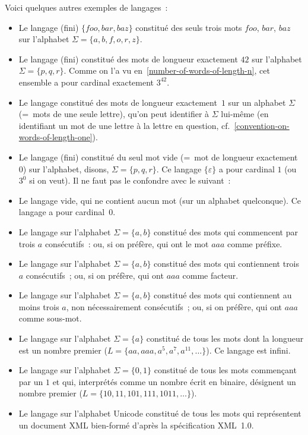 \documentclass[12pt,a4paper]{article}
\theoremstyle{definition}
\begin{document}
Voici quelques autres exemples de langages :
\begin{itemize}
\item Le langage (fini) $\{foo,bar,baz\}$ constitué des seuls trois
  mots $foo$, $bar$, $baz$ sur l'alphabet $\Sigma = \{a,b,f,o,r,z\}$.
\item Le langage (fini) constitué des mots de longueur exactement $42$
  sur l'alphabet $\Sigma = \{p,q,r\}$.  Comme on l'a vu
  en \ref{number-of-words-of-length-n}, cet ensemble a pour cardinal
  exactement $3^{42}$.
\item Le langage constitué des mots de longueur exactement $1$ sur un
  alphabet $\Sigma$ (= mots de une seule lettre), qu'on peut identifier
  à $\Sigma$ lui-même (en identifiant un mot de une lettre à la lettre
  en question, cf. \ref{convention-on-words-of-length-one}).
\item Le langage (fini) constitué du seul mot vide (= mot de longueur
  exactement $0$) sur l'alphabet, disons, $\Sigma = \{p,q,r\}$.  Ce
  langage $\{\varepsilon\}$ a pour cardinal $1$ (ou $3^0$ si on veut).
  Il ne faut pas le confondre avec le suivant :
\item Le langage vide, qui ne contient aucun mot (sur un alphabet
  quelconque).  Ce langage a pour cardinal $0$.
\item Le langage sur l'alphabet $\Sigma=\{a,b\}$ constitué des mots
  qui commencent par trois $a$ consécutifs : ou, si on préfère, qui
  ont le mot $aaa$ comme préfixe.
\item Le langage sur l'alphabet $\Sigma=\{a,b\}$ constitué des mots
  qui contiennent trois $a$ consécutifs ; ou, si on préfère, qui ont
  $aaa$ comme facteur.
\item Le langage sur l'alphabet $\Sigma=\{a,b\}$ constitué des mots
  qui contiennent au moins trois $a$, non nécessairement consécutifs ;
  ou, si on préfère, qui ont $aaa$ comme sous-mot.
\item Le langage sur l'alphabet $\Sigma=\{a\}$ constitué de tous les
  mots dont la longueur est un nombre premier ($L = \{aa, aaa, a^5,
  a^7, a^{11},\ldots\}$).  Ce langage est infini.
\item Le langage sur l'alphabet $\Sigma=\{0,1\}$ constitué de tous les
  mots commençant par un $1$ et qui, interprétés comme un nombre écrit
  en binaire, désignent un nombre premier ($L = \{10, 11, 101, 111,
  1011, \ldots\}$).
\item Le langage sur l'alphabet Unicode constitué de tous les mots qui
  représentent un document XML bien-formé d'après la spécification
  XML 1.0.
\end{itemize}
\end{document}
